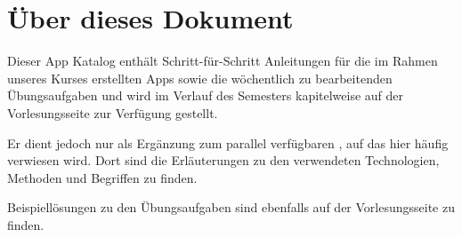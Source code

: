 \documentclass[parskip=half, final]{scrreprt}
\begin{document}
\maketitle

\tableofcontents


\chapter{Über dieses Dokument}

Dieser App Katalog enthält Schritt-für-Schritt Anleitungen für die im Rahmen unseres Kurses erstellten Apps sowie die wöchentlich zu bearbeitenden Übungsaufgaben und wird im Verlauf des Semesters kapitelweise auf der Vorlesungsseite  zur Verfügung gestellt.

Er dient jedoch nur als Ergänzung zum parallel verfügbaren , auf das hier häufig verwiesen wird. Dort sind die Erläuterungen zu den verwendeten Technologien, Methoden und Begriffen zu finden.

Beispiellösungen zu den Übungsaufgaben sind ebenfalls auf der Vorlesungsseite zu finden.
\end{document}
